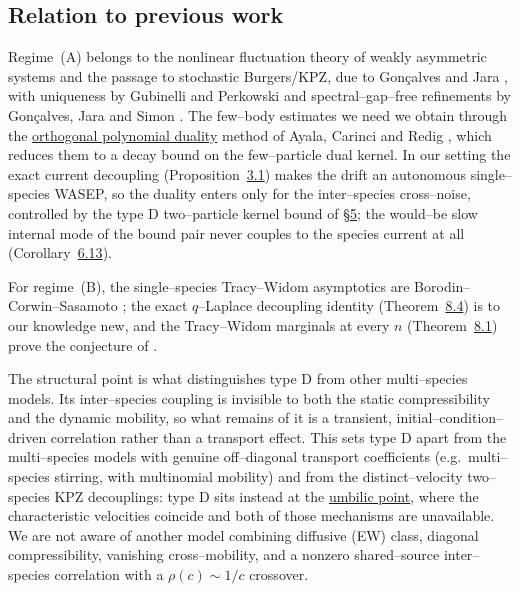 \documentclass[11pt]{article}
\theoremstyle{plain}
\theoremstyle{definition}
\theoremstyle{remark}
\begin{document}
\subsection{Relation to previous work}\label{sec_introlit}
Regime~(A) belongs to the nonlinear fluctuation theory of weakly asymmetric systems and
the passage to stochastic Burgers/KPZ, due to Gon\c{c}alves and Jara \cite{GJ}, with
uniqueness by Gubinelli and Perkowski \cite{GP} and spectral--gap--free refinements by
Gon\c{c}alves, Jara and Simon \cite{GJS}. The few--body estimates we need we obtain
through the \underline{orthogonal polynomial duality} method of Ayala, Carinci and Redig
\cite{ACR,ACR2}, which reduces them to a decay bound on the few--particle dual kernel. In
our setting the exact current decoupling (Proposition~\hyperref[prop_decouple]{3.1}) makes the
drift an autonomous single--species WASEP, so the duality enters only for the
inter--species cross--noise, controlled by the type D two--particle kernel bound of
\S\hyperref[sec_kernel]{5}; the would--be slow internal mode of the bound pair never couples to
the species current at all (Corollary~\hyperref[prop_sym]{6.13}).

For regime~(B), the single--species Tracy--Widom asymptotics are
Borodin--Corwin--Sasamoto \cite{BCS}; the exact $q$--Laplace decoupling identity
(Theorem~\hyperref[thm_cov]{8.4}) is to our knowledge new, and the Tracy--Widom marginals at
every $n$ (Theorem~\hyperref[thm_marg]{8.1}) prove the conjecture of \cite[\S3.1.1]{REU}.

The structural point is what distinguishes type D from other multi--species models. Its
inter--species coupling is invisible to both the static compressibility and the dynamic
mobility, so what remains of it is a transient, initial--condition--driven correlation
rather than a transport effect. This sets type D apart from the multi--species models
with genuine off--diagonal transport coefficients (e.g.\ multi--species stirring, with
multinomial mobility) and from the distinct--velocity two--species KPZ decouplings:
type D sits instead at the \underline{umbilic point}, where the characteristic velocities
coincide and both of those mechanisms are unavailable. We are not aware of another
model combining diffusive (EW) class, diagonal compressibility, vanishing
cross--mobility, and a nonzero shared--source inter--species correlation with a
$\rho(c)\sim1/c$ crossover.
\end{document}

